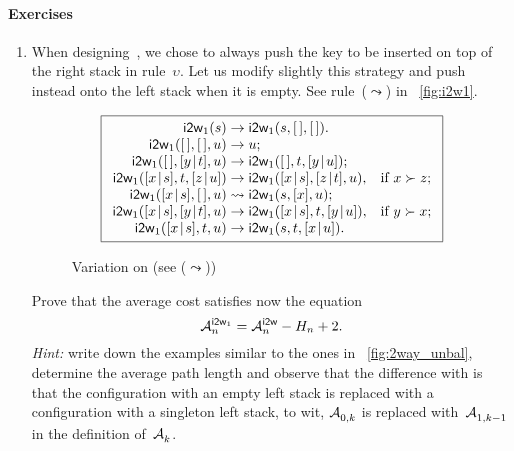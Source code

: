 \paragraph{Exercises}
\begin{enumerate}

  \item When designing~, we chose to
    always push the key to be inserted on top of the right stack in
    rule~\(\upsilon\). Let us modify slightly this strategy and push
    instead onto the left stack when it is empty. See
    rule~(\(\leadsto\)) in \fig~\vref{fig:i2w1}.
    \begin{figure}[b]
    \begin{equation*}
      \boxed{%
      \begin{array}{r@{\;}l@{\;}ll}
        \fun{i2w}_1(s) & \rightarrow
                      & \fun{i2w}_1(s,\el,\el).\\
        \fun{i2w}_1(\el,\el,u) & \rightarrow & u;\\
        \fun{i2w}_1(\el,\cons{y}{t},u)
                     & \rightarrow
                     & \fun{i2w}_1(\el,t,\cons{y}{u});\\
        \fun{i2w}_1(\cons{x}{s},t,\cons{z}{u})
                     & \rightarrow
                     & \fun{i2w}_1(\cons{x}{s},\cons{z}{t},u),
                     & \text{if \(x \succ z\)};\\
        \fun{i2w}_1(\cons{x}{s},\el,u)
                     & \leadsto
                     & \fun{i2w}_1(s,[x],u);\\
        \fun{i2w}_1(\cons{x}{s},\cons{y}{t},u)
                     & \rightarrow
                     & \fun{i2w}_1(\cons{x}{s},t,\cons{y}{u}),
                     & \text{if \(y \succ x\)};\\
        \fun{i2w}_1(\cons{x}{s},t,u)
                     & \rightarrow
                     & \fun{i2w}_1(s,t,\cons{x}{u}).
      \end{array}}
    \end{equation*}
    \caption{Variation  on  (see
      (\(\leadsto\)))\label{fig:i2w1}}
    \end{figure}
    Prove that the average cost satisfies now the equation
     
    \begin{equation*}
      \M{\fun{i2w}_1}{n} = \M{\fun{i2w}}{n} - H_n + 2.
    \end{equation*}
    \emph{Hint:} write down the examples similar to the ones in
    \fig~\vref{fig:2way_unbal}, determine the average path length and
    observe that the difference with
     is that the configuration with
    an empty left stack is replaced with a configuration with a
    singleton left stack, to wit, \(\M{}{0,k}\) is replaced
    with~\(\M{}{1,k-1}\) in the definition of~\(\M{}{k}\).


\end{enumerate}
